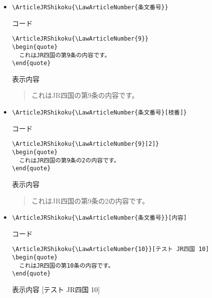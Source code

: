 \documentclass[oneside,10pt,a4paper]{jsarticle}
\begin{document}
  \begin{itemize}
    \item \verb|\ArticleJRShikoku{\LawArticleNumber{条文番号}}|
      \begin{itembox}[l]{コード}
        {\footnotesize\begin{verbatim}
\ArticleJRShikoku{\LawArticleNumber{9}}
\begin{quote}
  これはJR四国の第9条の内容です。
\end{quote}\end{verbatim}}
      \end{itembox}
      \begin{itembox}[l]{表示内容}
        \begin{quote}
          これはJR四国の第9条の内容です。
        \end{quote}
      \end{itembox}
    \item \verb|\ArticleJRShikoku{\LawArticleNumber{条文番号}[枝番]}|
      \begin{itembox}[l]{コード}
        {\footnotesize\begin{verbatim}
\ArticleJRShikoku{\LawArticleNumber{9}[2]}
\begin{quote}
  これはJR四国の第9条の2の内容です。
\end{quote}\end{verbatim}}
      \end{itembox}
      \begin{itembox}[l]{表示内容}
        \begin{quote}
          これはJR四国の第9条の2の内容です。
        \end{quote}
      \end{itembox}
    \newpage
    \item \verb|\ArticleJRShikoku{\LawArticleNumber{条文番号}}[内容]|
      \begin{itembox}[l]{コード}
        {\footnotesize\begin{verbatim}
\ArticleJRShikoku{\LawArticleNumber{10}}[テスト JR四国 10]
\begin{quote}
  これはJR四国の第10条の内容です。
\end{quote}\end{verbatim}}
      \end{itembox}
      \begin{itembox}[l]{表示内容}
        [テスト JR四国 10]

\end{itembox}
\end{itemize}
\end{document}
